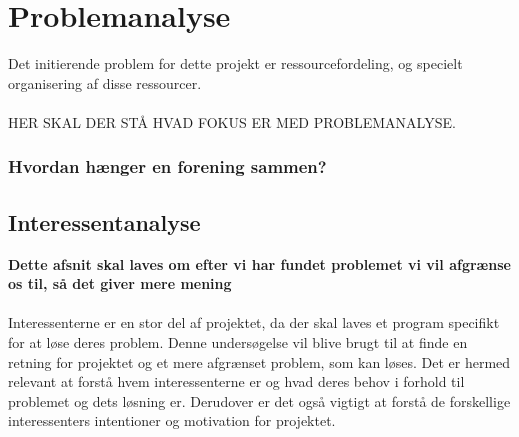 \chapter{Problemanalyse}\label{ch:ch2label}




Det initierende problem for dette projekt er ressourcefordeling, og specielt organisering af disse ressourcer. 
\\ 
\\
HER SKAL DER STÅ HVAD FOKUS ER MED PROBLEMANALYSE.

\subsection*{Hvordan hænger en forening sammen?}




\section{Interessentanalyse}
\textbf{Dette afsnit skal laves om efter vi har fundet problemet vi vil afgrænse os til, så det giver mere mening}
\\ \\
Interessenterne er en stor del af projektet, da der skal laves et program specifikt for at løse deres problem. Denne undersøgelse vil blive brugt til at finde en retning for projektet og et mere afgrænset problem, som kan løses. Det er hermed relevant at forstå hvem interessenterne er og hvad deres behov i forhold til problemet og dets løsning er. Derudover er det også vigtigt at forstå de forskellige interessenters intentioner og motivation for projektet.

